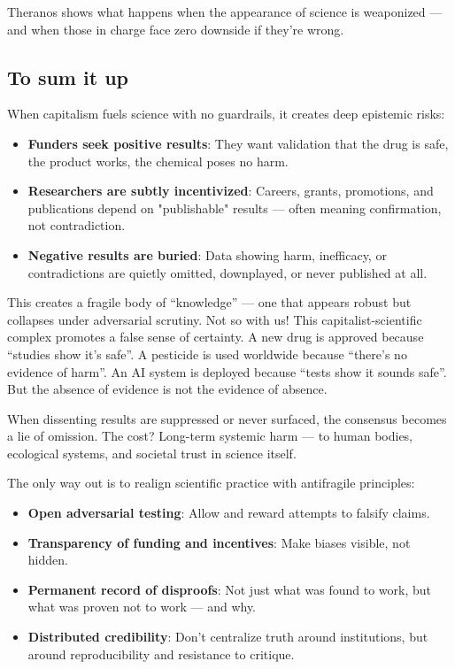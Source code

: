 Theranos shows what happens when the appearance of science is weaponized — and when those in charge face
zero downside if they’re wrong.

\cite{USvsHolmes2022}
\cite{buzzfeednews2018}
\cite{justivegove-theranos}

\subsection{To sum it up}

When capitalism fuels science with no guardrails, it creates deep epistemic risks:
\begin{itemize}
	\item \textbf{Funders seek positive results}: They want validation that the drug is safe, the product works, the chemical poses no harm.
	\item \textbf{Researchers are subtly incentivized}: Careers, grants, promotions, and publications depend on "publishable" results — often meaning confirmation, not contradiction.
	\item \textbf{Negative results are buried}: Data showing harm, inefficacy, or contradictions are quietly omitted, downplayed, or never published at all.
\end{itemize}

This creates a fragile body of “knowledge” — one that appears robust but collapses under adversarial scrutiny. Not so with us!  This capitalist-scientific complex promotes a false sense of certainty. A new drug is approved because “studies show it’s safe”. A pesticide is used worldwide because “there’s no evidence of harm”. An AI system is deployed because “tests show it sounds safe”. But the absence of evidence is not the evidence of absence. 

When dissenting results are suppressed or never surfaced, the consensus becomes a lie of omission. The cost? Long-term systemic harm — to human bodies, ecological systems, and societal trust in science itself.

The only way out is to realign scientific practice with antifragile principles:
\begin{itemize}
	\item \textbf{Open adversarial testing}: Allow and reward attempts to falsify claims.
	\item \textbf{Transparency of funding and incentives}: Make biases visible, not hidden.
	\item \textbf{Permanent record of disproofs}: Not just what was found to work, but what was proven not to work — and why.
	\item \textbf{Distributed credibility}: Don’t centralize truth around institutions, but around reproducibility and resistance to critique.
\end{itemize}